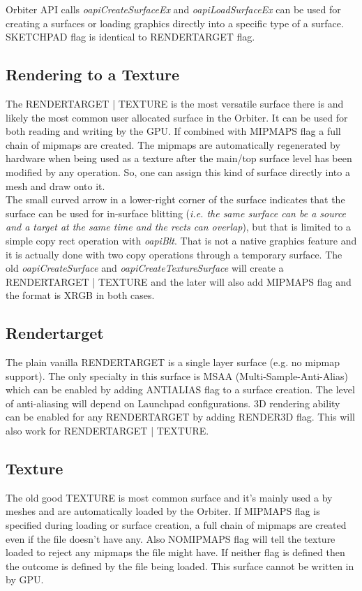 \documentclass[Orbiter Developer Manual.tex]{subfiles}
\begin{document}
Orbiter API calls \textit{oapiCreateSurfaceEx} and \textit{oapiLoadSurfaceEx} can be used for creating a surfaces or loading graphics directly into a specific type of a surface. 
\textsc{SKETCHPAD} flag is identical to \textsc{RENDERTARGET} flag.

\subsection{Rendering to a Texture}
The \textsc{RENDERTARGET | TEXTURE} is the most versatile surface there is and likely the most common user allocated surface in the Orbiter. It can be used for both reading and writing by the GPU. If combined with \textsc{MIPMAPS} flag a full chain of mipmaps are created. The mipmaps are automatically regenerated by hardware when being used as a texture after the main/top surface level has been modified by any operation. So, one can assign this kind of surface directly into a mesh and draw onto it.\\

The small curved arrow in a lower-right corner of the surface indicates that the surface can be used for in-surface blitting (\textsl{i.e. the same surface can be a source and a target at the same time and the rects can overlap}), but that is limited to a simple copy rect operation with \textit{oapiBlt}. That is not a native graphics feature and it is actually done with two copy operations through a temporary surface. The old \textit{oapiCreateSurface} and \textit{oapiCreateTextureSurface} will create a \textsc{RENDERTARGET | TEXTURE} and the later will also add \textsc{MIPMAPS} flag and the format is XRGB in both cases. 

\subsection{Rendertarget}
The plain vanilla \textsc{RENDERTARGET} is a single layer surface (e.g. no mipmap support). The only specialty in this surface is MSAA (Multi-Sample-Anti-Alias) which can be enabled by adding \textsc{ANTIALIAS} flag to a surface creation. The level of anti-aliasing will depend on Launchpad configurations. 3D rendering ability can be enabled for any \textsc{RENDERTARGET} by adding \textsc{RENDER3D} flag. This will also work for \textsc{RENDERTARGET | TEXTURE}.

\subsection{Texture}
The old good \textsc{TEXTURE} is most common surface and it’s mainly used a by meshes and are automatically loaded by the Orbiter. If \textsc{MIPMAPS} flag is specified during loading or surface creation, a full chain of mipmaps are created even if the file doesn’t have any. Also \textsc{NOMIPMAPS} flag will tell the texture loaded to reject any mipmaps the file might have. If neither flag is defined then the outcome is defined by the file being loaded. This surface cannot be written in by GPU.
\end{document}
